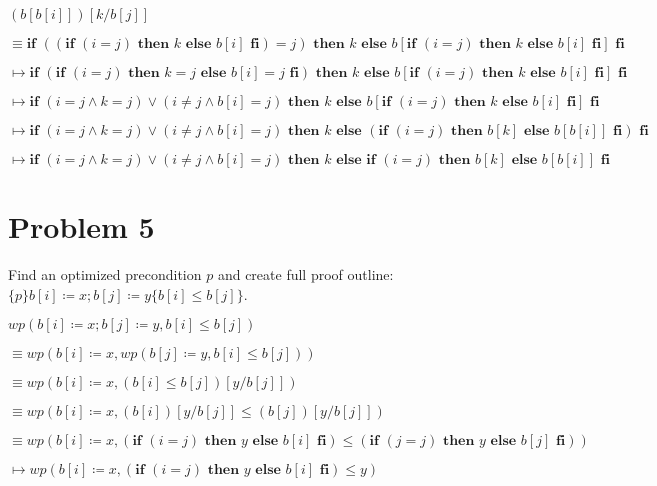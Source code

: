 \documentclass{article}
\begin{document}
$ (b[b[i]])[k/b[j]] $

\qquad \qquad $ \equiv \textbf{if } ((\textbf{if } (i=j) \textbf{ then } k \textbf{ else } b[i] \textbf{ fi})=j) \textbf{ then } k \textbf{ else } b[\textbf{if } (i=j) \textbf{ then } k \textbf{ else } b[i] \textbf{ fi}] \textbf{ fi} $

\qquad \qquad $ \mapsto  \textbf{if } (\textbf{if } (i=j) \textbf{ then } k=j \textbf{ else } b[i]=j \textbf{ fi}) \textbf{ then } k \textbf{ else } b[\textbf{if } (i=j) \textbf{ then } k \textbf{ else } b[i] \textbf{ fi}] \textbf{ fi} $

\qquad \qquad $ \mapsto  \textbf{if } (i=j \wedge k=j) \vee (i \neq j \wedge b[i]=j) \textbf{ then } k \textbf{ else } b[\textbf{if } (i=j) \textbf{ then } k \textbf{ else } b[i] \textbf{ fi}] \textbf{ fi} $

\qquad \qquad $ \mapsto  \textbf{if } (i=j \wedge k=j) \vee (i \neq j \wedge b[i]=j) \textbf{ then } k \textbf{ else } (\textbf{if } (i=j) \textbf{ then } b[k] \textbf{ else } b[b[i]] \textbf{ fi}) \textbf{ fi} $

\qquad \qquad $ \mapsto  \textbf{if } (i=j \wedge k=j) \vee (i \neq j \wedge b[i]=j) \textbf{ then } k \textbf{ else if } (i=j) \textbf{ then } b[k] \textbf{ else } b[b[i]] \textbf{ fi} $

\section*{Problem 5}

Find an optimized precondition $p$ and create full proof outline: $\{p\}b[i] \coloneqq x;b[j] \coloneqq y \{b[i] \leq b[j]\}$.

\vspace{10pt}

$ wp(b[i] \coloneqq x;b[j] \coloneqq y, b[i] \leq b[j]) $

\qquad \qquad $ \equiv wp(b[i] \coloneqq x, wp(b[j] \coloneqq y, b[i] \leq b[j]))$

\qquad \qquad $ \equiv wp(b[i] \coloneqq x, (b[i] \leq b[j]) [y/b[j]])$

\qquad \qquad $ \equiv wp(b[i] \coloneqq x, (b[i])[y/b[j]] \leq (b[j])[y/b[j]])$

\qquad \qquad $ \equiv wp(b[i] \coloneqq x, (\textbf{if } (i=j) \textbf{ then } y \textbf{ else } b[i] \textbf{ fi}) \leq (\textbf{if } (j=j) \textbf{ then } y \textbf{ else } b[j] \textbf{ fi}))$

\qquad \qquad $ \mapsto wp(b[i] \coloneqq x, (\textbf{if } (i=j) \textbf{ then } y \textbf{ else } b[i] \textbf{ fi}) \leq y)$
\end{document}
